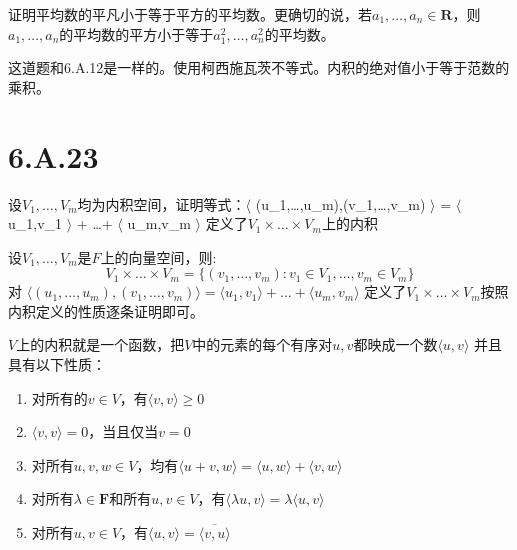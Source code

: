\documentclass[10pt,a4paper,UTF8]{article}
\begin{document}
\begin{tikzproblem}
证明平均数的平凡小于等于平方的平均数。更确切的说，若\(a_{1},\ldots ,a_{n}\in \mathbf{R}\)，则\(a_{1},\ldots ,a_{n}\)的平均数的平方小于等于\(a_{1}^{2},\ldots ,a_{n}^{2}\)的平均数。
\end{tikzproblem}
\begin{tikzanswer}
这道题和6.A.12是一样的。使用柯西施瓦茨不等式。内积的绝对值小于等于范数的乘积。
\end{tikzanswer}
\section{6.A.23}
\label{sec:org445bbcb}


\begin{tikzproblem}
设\(V_{1},\ldots ,V_{m}\)均为内积空间，证明等式：\(\langle\) (u\_1,\ldots ,u\_m),(v\_1,\ldots ,v\_m) \(\rangle\)  = \(\langle\) u\_1,v\_1 \(\rangle\) + \ldots + \(\langle\) u\_m,v\_m \(\rangle\)  定义了\(V_{1}\times \ldots \times V_{m}\)上的内积
\end{tikzproblem}

\begin{tikzanswer}
设\(V_{1},\ldots ,V_{m}\)是\(F\)上的向量空间，则:
\begin{equation}
\label{eq:25}
V_{1}\times \ldots \times V_{m} = \{ (v_{1},\ldots ,v_{m}): v_{1}\in V_{1},\ldots ,v_{m}\in V_{m} \}
\end{equation}
对 \(\langle (u_1,\ldots ,u_m),(v_1,\ldots ,v_m) \rangle  = \langle u_1,v_1 \rangle + \ldots + \langle u_m,v_m \rangle\)   定义了\(V_{1}\times \ldots \times V_{m}\)按照内积定义的性质逐条证明即可。

\(V\)上的内积就是一个函数，把\(V\)中的元素的每个有序对\(u,v\)都映成一个数\(\langle u,v \rangle\) 并且具有以下性质：
\begin{enumerate}
\item 对所有的\(v\in V\)，有\(\langle v,v \rangle \geq 0\)
\item \(\langle v,v \rangle =  0\)，当且仅当\(v=0\)
\item 对所有\(u,v,w\in V\)，均有\(\langle u+v,w \rangle = \langle u,w \rangle + \langle v,w \rangle\)
\item 对所有\(\lambda\in \mathbf{F}\)和所有\(u,v\in V\)，有\(\langle \lambda u,v \rangle = \lambda \langle u,v \rangle\)
\item 对所有\(u,v\in V\)，有\(\langle u,v \rangle = \overline{ \langle v,u \rangle }\)
\end{enumerate}
\end{tikzanswer}
\end{document}
